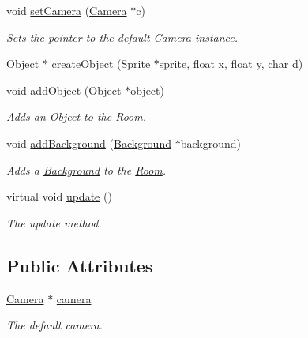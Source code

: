 \begin{DoxyCompactItemize}
void \hyperlink{class_room_aee02820d3a2a3c70d59e2f0455338cd7}{set\-Camera} (\hyperlink{class_camera}{Camera} $\ast$c)
\begin{DoxyCompactList}\small\item\em Sets the pointer to the default \hyperlink{class_camera}{Camera} instance. \end{DoxyCompactList}\item 
\hyperlink{class_object}{Object} $\ast$ \hyperlink{class_room_a0c09098560d165c23287969c77c702cc}{create\-Object} (\hyperlink{class_sprite}{Sprite} $\ast$sprite, float x, float y, char d)
\item 
void \hyperlink{class_room_acf9689e04f8bc98d658d12d62b95e8bf}{add\-Object} (\hyperlink{class_object}{Object} $\ast$object)
\begin{DoxyCompactList}\small\item\em Adds an \hyperlink{class_object}{Object} to the \hyperlink{class_room}{Room}. \end{DoxyCompactList}\item 
void \hyperlink{class_room_ac9b5844f9e5e251d95ec60c3ec2bc1b6}{add\-Background} (\hyperlink{class_background}{Background} $\ast$background)
\begin{DoxyCompactList}\small\item\em Adds a \hyperlink{class_background}{Background} to the \hyperlink{class_room}{Room}. \end{DoxyCompactList}\item 
virtual void \hyperlink{class_room_a801c3de6ddff533edeb8fa68c7fcbb61}{update} ()
\begin{DoxyCompactList}\small\item\em The update method. \end{DoxyCompactList}\end{DoxyCompactItemize}
\subsection*{Public Attributes}
\begin{DoxyCompactItemize}
\item 
\hyperlink{class_camera}{Camera} $\ast$ \hyperlink{class_room_ae5dbd0283ba91cb66a53fd6f5229c4a3}{camera}
\begin{DoxyCompactList}\small\item\em The default camera. \end{DoxyCompactList}\end{DoxyCompactItemize}
